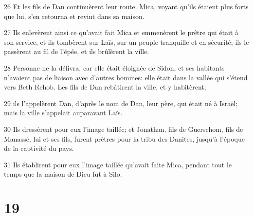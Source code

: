 \par 26 Et les fils de Dan continuèrent leur route. Mica, voyant qu'ils étaient plus forts que lui, s'en retourna et revint dans sa maison.
\par 27 Ils enlevèrent ainsi ce qu'avait fait Mica et emmenèrent le prêtre qui était à son service, et ils tombèrent sur Laïs, sur un peuple tranquille et en sécurité; ils le passèrent au fil de l'épée, et ils brûlèrent la ville.
\par 28 Personne ne la délivra, car elle était éloignée de Sidon, et ses habitants n'avaient pas de liaison avec d'autres hommes: elle était dans la vallée qui s'étend vers Beth Rehob. Les fils de Dan rebâtirent la ville, et y habitèrent;
\par 29 ils l'appelèrent Dan, d'après le nom de Dan, leur père, qui était né à Israël; mais la ville s'appelait auparavant Laïs.
\par 30 Ils dressèrent pour eux l'image taillée; et Jonathan, fils de Guerschom, fils de Manassé, lui et ses fils, furent prêtres pour la tribu des Danites, jusqu'à l'époque de la captivité du pays.
\par 31 Ils établirent pour eux l'image taillée qu'avait faite Mica, pendant tout le temps que la maison de Dieu fut à Silo.

\chapter{19}

